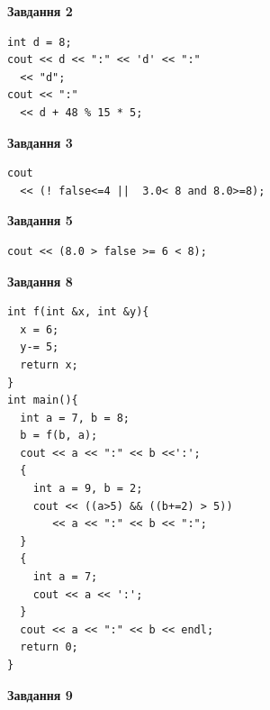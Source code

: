 \documentclass[12pt, ukrainian]{article}
\begin{document}
{\begin {large}
\begin{minipage}[t]{7.0cm}
\end{minipage}
\vline \hspace{1mm}
\begin{minipage}[t]{11.0cm}

\begin{center}
\textbf{Завдання 2}
\end{center}
\vspace{-8mm}

\begin{verbatim}
int d = 8;
cout << d << ":" << 'd' << ":" 
  << "d";
cout << ":" 
  << d + 48 % 15 * 5;
\end{verbatim}



\begin{center}
\textbf{Завдання 3}
\end{center}
\vspace{-8mm}

\begin{verbatim}
cout 
  << (! false<=4 ||  3.0< 8 and 8.0>=8);
\end{verbatim}



\begin{center}
\textbf{Завдання 5}
\end{center}
\vspace{-8mm}

\begin{verbatim}
cout << (8.0 > false >= 6 < 8);
\end{verbatim}



\begin{center}
\textbf{Завдання 8}
\end{center}
\vspace{-8mm}

\begin{verbatim}
int f(int &x, int &y){
  x = 6;
  y-= 5;
  return x;
}
int main(){
  int a = 7, b = 8;
  b = f(b, a);
  cout << a << ":" << b <<':';
  {
    int a = 9, b = 2;
    cout << ((a>5) && ((b+=2) > 5))
       << a << ":" << b << ":";
  }
  {
    int a = 7;
    cout << a << ':';
  }
  cout << a << ":" << b << endl;
  return 0;
}
\end{verbatim}

\end{minipage}


\begin{minipage}[t]{7.0cm}

\begin{center}
\textbf{Завдання 9}
\end{center}
\vspace{-8mm}


\end{minipage}
\end{large}}
\end{document}
